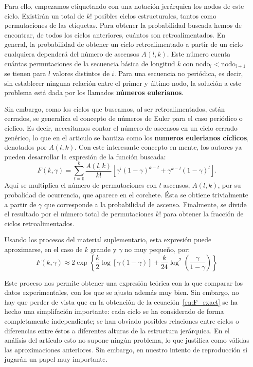 \documentclass[1p]{elsarticle}
\begin{document}
    Para ello, empezamos etiquetando con una notación jerárquica los nodos de este ciclo. 
    Existirán un total de $k!$ posibles ciclos estructurales, tantos como permutaciones de las etiquetas. 
    Para obtener la probabilidad buscada hemos de encontrar, de todos los ciclos anteriores, cuántos son retroalimentados.
    En general, la probabilidad de obtener un ciclo retroalimentado a partir de un ciclo cualquiera dependerá del número de ascensos $A(l,k)$.
    Este número cuenta cuántas permutaciones de la secuencia básica de longitud $k$ con $\textrm{nodo}_{i} < \textrm{nodo}_{i+1}$ se tienen para $l$ valores distintos de $i$. Para una secuencia no periódica, es decir, sin establecer ninguna relación entre el primer y último nodo, la solución a este problema está dada por los llamados \textbf{números eulerianos}.

    Sin embargo, como los ciclos que buscamos, al ser retroalimentados, están cerrados, se  generaliza el concepto de números de Euler para el caso periódico o cíclico.
    Es decir, necesitamos contar el número de ascensos en un ciclo cerrado genérico, lo que en el articulo se bautiza como los \textbf{numeros eulerianos cíclicos}, denotados por $A(l,k)$.
Con este interesante concepto en mente, los autores ya pueden desarrollar la expresión de la función buscada: %
    \begin{equation}
    \label{eq:F_exact}
        F(k,\gamma)=\sum_{l=0}^{k}\frac{A(l,k)}{k!}[\gamma^l(1-\gamma)^{k-l}+\gamma^{k-l}(1-\gamma)^l]
    .
    \end{equation}
Aquí se multiplica el número de permutaciones con $l$ ascensos, $A(l,k)$, por su probalidad de ocurrencia, que aparece en el corchete.
Ésta se obtiene trivialmente a partir de $\gamma$ que corresponde a la probabilidad de ascenso. Finalmente, se divide el resultado por el número total de permutaciones $k!$ para obtener la fracción de ciclos retroalimentados.

Usando los procesos del material suplementario, esta expresión puede aproximarse, en el caso de $k$ grande y $\gamma$ no muy pequeño, por:
\begin{equation}
    \label{eq:F_asymp}
    F(k,\gamma)
    \approx 
    2\exp\left\{\frac{k}{2}\log[\gamma(1-\gamma)]+\frac{k}{24} \log^2(\frac{\gamma}{1-\gamma})\right\}
\end{equation}

    Este proceso nos permite obtener una expresión teórica con la que comparar los datos experimentales, con los que se ajusta además muy bien.
    Sin embargo, no hay que perder de vista que en la obtención de la ecuación~\ref{eq:F_exact} se ha hecho una simplifación importante: cada ciclo se ha considerado de forma completamente independiente;
    se han obviado posibles relaciones entre ciclos o diferencias entre éstos a diferentes alturas de la estructura jerárquica.
    En el análisis del artículo esto no supone ningún problema, lo que justifica como válidas las aproximaciones anteriores.
    Sin embargo, en nuestro intento de reproducción sí jugarán un papel muy importante.
\end{document}
